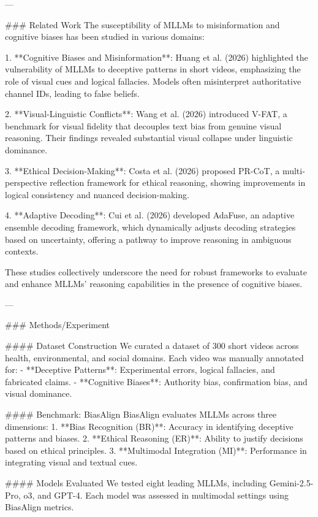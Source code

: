 ---

### Related Work  
The susceptibility of MLLMs to misinformation and cognitive biases has been studied in various domains:

1. **Cognitive Biases and Misinformation**: Huang et al. (2026) highlighted the vulnerability of MLLMs to deceptive patterns in short videos, emphasizing the role of visual cues and logical fallacies. Models often misinterpret authoritative channel IDs, leading to false beliefs.
   
2. **Visual-Linguistic Conflicts**: Wang et al. (2026) introduced V-FAT, a benchmark for visual fidelity that decouples text bias from genuine visual reasoning. Their findings revealed substantial visual collapse under linguistic dominance.

3. **Ethical Decision-Making**: Costa et al. (2026) proposed PR-CoT, a multi-perspective reflection framework for ethical reasoning, showing improvements in logical consistency and nuanced decision-making.

4. **Adaptive Decoding**: Cui et al. (2026) developed AdaFuse, an adaptive ensemble decoding framework, which dynamically adjusts decoding strategies based on uncertainty, offering a pathway to improve reasoning in ambiguous contexts.

These studies collectively underscore the need for robust frameworks to evaluate and enhance MLLMs' reasoning capabilities in the presence of cognitive biases.

---

### Methods/Experiment  

#### Dataset Construction  
We curated a dataset of 300 short videos across health, environmental, and social domains. Each video was manually annotated for:
- **Deceptive Patterns**: Experimental errors, logical fallacies, and fabricated claims.
- **Cognitive Biases**: Authority bias, confirmation bias, and visual dominance.

#### Benchmark: BiasAlign  
BiasAlign evaluates MLLMs across three dimensions:
1. **Bias Recognition (BR)**: Accuracy in identifying deceptive patterns and biases.
2. **Ethical Reasoning (ER)**: Ability to justify decisions based on ethical principles.
3. **Multimodal Integration (MI)**: Performance in integrating visual and textual cues.

#### Models Evaluated  
We tested eight leading MLLMs, including Gemini-2.5-Pro, o3, and GPT-4. Each model was assessed in multimodal settings using BiasAlign metrics.

